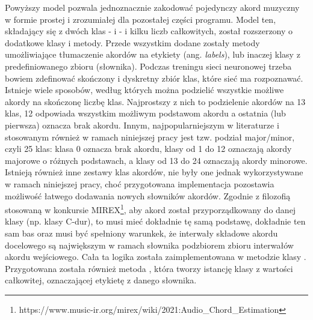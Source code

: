 Powyższy model pozwala jednoznacznie zakodować pojedynczy akord muzyczny w formie prostej i
zrozumiałej dla pozostałej części programu. Model ten, składający się z dwóch klas - 
i  - i kilku liczb całkowitych, został rozszerzony o dodatkowe klasy i metody. Przede
wszystkim dodane zostały metody umożliwiające tłumaczenie akordów na etykiety (ang. \emph{labels}),
lub inaczej klasy z predefiniowanego zbioru (słownika). Podczas treningu sieci neuronowej trzeba
bowiem zdefinować skończony i dyskretny zbiór klas, które sieć ma rozpoznawać. Istnieje wiele
sposobów, według których można podzielić wszystkie możliwe akordy na skończonę liczbę klas.
Najprostszy z nich to podzielenie akordów na 13 klas, 12 odpowiada wszystkim możliwym podstawom
akordu a ostatnia (lub pierwsza) oznacza brak akordu. Innym, najpopularniejszym w literaturze i
stosowanym również w ramach niniejszej pracy jest tzw. podział major/minor, czyli 25 klas: klasa 0
oznacza brak akordu, klasy od 1 do 12 oznaczają akordy majorowe o różnych podstawach, a klasy od 13
do 24 oznaczają akordy minorowe. Istnieją również inne zestawy klas akordów, nie były one jednak
wykorzystywane w ramach niniejszej pracy, choć przygotowana implementacja pozostawia możliwość
łatwego dodawania nowych słowników akordów. Zgodnie z filozofią stosowaną w konkursie
MIREX\footnote{https://www.music-ir.org/mirex/wiki/2021:Audio\_Chord\_Estimation}, aby akord został
przyporządkowany do danej klasy (np. klasy C-dur), to musi mieć dokładnie tę samą podstawę,
dokładnie ten sam bas oraz musi być spełniony warunkek, że interwały składowe akordu docelowego są
największym w ramach słownika podzbiorem zbioru interwałów akordu wejściowego. Cała ta logika
została zaimplementowana w metodzie  klasy . Przygotowana została
również metoda , która tworzy istancję klasy  z wartości całkowitej,
oznaczającej etykietę z danego słownika.

